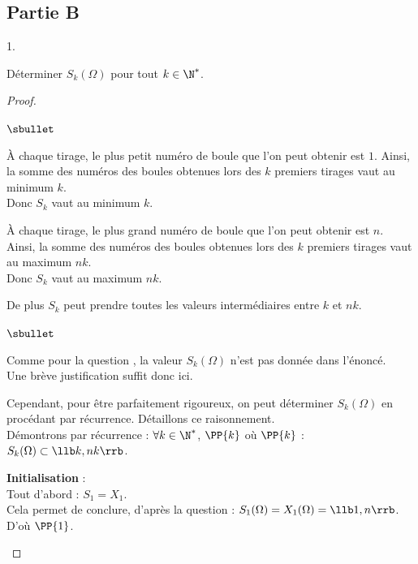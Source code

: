 \newpage


\subsection*{Partie B}

\begin{noliste}{1.}
  \setcounter{enumi}{4}
\item Déterminer $S_k(\Omega)$ pour tout $k\in\N^*$.
  
  \begin{proof}~
    \begin{noliste}{$\sbullet$}
    \item À chaque tirage, le plus petit numéro de boule que l'on peut
      obtenir est $1$. Ainsi, la somme des numéros des boules
      obtenues lors des $k$ premiers tirages vaut au minimum
      $k$.\\[.2cm] 
      Donc $S_k$ vaut au minimum $k$.
    \item À chaque tirage, le plus grand numéro de boule que l'on peut
      obtenir est $n$. Ainsi, la somme des numéros des boules
      obtenues lors des $k$ premiers tirages vaut au maximum
      $nk$.\\[.2cm] 
      Donc $S_k$ vaut au maximum $nk$.
    \item De plus $S_k$ peut prendre toutes les valeurs intermédiaires
      entre $k$ et $nk$.
    \end{noliste}
    \begin{remark}%
      \begin{noliste}{$\sbullet$}
      \item Comme pour la question , la valeur
        $S_k(\Omega)$ n'est pas donnée dans l'énoncé.\\
        Une brève justification suffit donc ici.
      \item Cependant, pour être parfaitement rigoureux, on peut
        déterminer $S_k(\Omega)$ en procédant par
        récurrence. Détaillons ce raisonnement.\\[.2cm]
        Démontrons par récurrence : $\forall k\in\N^*$, $\PP{k}$ \quad
        où \quad $\PP{k}$ : $S_k(\Omega) \subset \llb k,nk\rrb$.
        \begin{noliste}{\fitem}
        \item {\bf Initialisation} : \\
          Tout d'abord : $S_1=X_1$.\\
          Cela permet de conclure, d'après la question  :
          $S_1(\Omega) = X_1(\Omega) = \llb 1,n\rrb$.\\
          D'où $\PP{1}$.
        

\end{noliste}
\end{noliste}
\end{remark}
\end{proof}
\end{noliste}
